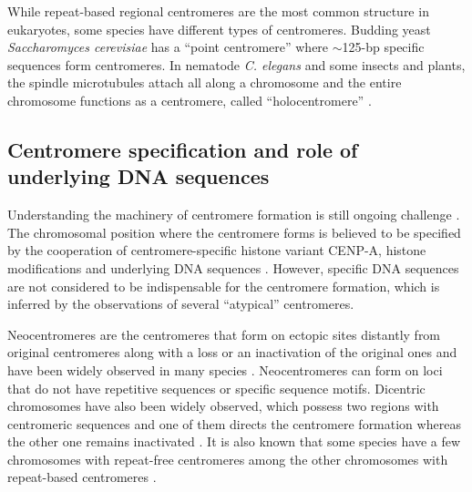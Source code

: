   While repeat-based regional centromeres are the most common structure in eukaryotes, some species have different types of centromeres. Budding yeast \textit{Saccharomyces cerevisiae} has a ``point centromere'' where $\sim$125-bp specific sequences form centromeres. In nematode \textit{C. elegans} and some insects and plants, the spindle microtubules attach all along a chromosome and the entire chromosome functions as a centromere, called ``holocentromere'' \cite{Plohl2014, Fukagawa2014}.



\subsection*{Centromere specification and role of underlying DNA sequences}
  Understanding the machinery of centromere formation is still ongoing challenge \cite{Plohl2014, Fukagawa2014, McKinley2016}. The chromosomal position where the centromere forms is believed to be specified by the cooperation of centromere-specific histone variant CENP-A, histone modifications and underlying DNA sequences \cite{Fukagawa2014}. However, specific DNA sequences are not considered to be indispensable for the centromere formation, which is inferred by the observations of several ``atypical'' centromeres.

  Neocentromeres are the centromeres that form on ectopic sites distantly from original centromeres along with a loss or an inactivation of the original ones and have been widely observed in many species \cite{Marshall2008, Scott2014}. Neocentromeres can form on loci that do not have repetitive sequences or specific sequence motifs. Dicentric chromosomes have also been widely observed, which possess two regions with centromeric sequences and one of them directs the centromere formation whereas the other one remains inactivated \cite{Earnshaw1985, Steiner1994, Han2006}. It is also known that some species have a few chromosomes with repeat-free centromeres among the other chromosomes with repeat-based centromeres \cite{Piras2010, Shang2010, Locke2011}.

